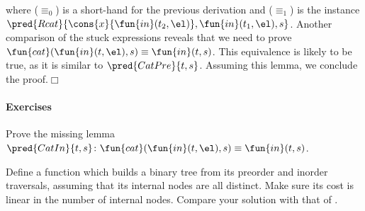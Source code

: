 where (\(\equiv_0\)) is a short\hyp{}hand for the previous derivation
and (\(\equiv_1\)) is the instance
\(\pred{Rcat}{\cons{x}{\fun{in}(t_2,\el)}, \fun{in}(t_1,\el),
  s}\). Another comparison of the stuck expressions reveals that we
need to prove \(\fun{cat}(\fun{in}(t,\el),s) \equiv
\fun{in}(t,s)\). This equivalence is likely to be true, as it is
similar to \(\pred{CatPre}{t,s}\).
Assuming this lemma, we conclude the proof.\hfill\(\Box\)

\paragraph{Exercises}
\begin{enumerate*}

  \item Prove the missing lemma \(\pred{CatIn}{t,s} \colon
  \fun{cat}(\fun{in}(t,\el),s) \equiv
  \fun{in}(t,s)\).

  \item Define a function which builds a binary tree from its preorder
    and inorder traversals, assuming that its internal nodes are all
    distinct. Make sure its cost is linear in the number of internal
    nodes. Compare your solution with that of \cite{MuBird_2003}.

\end{enumerate*}


